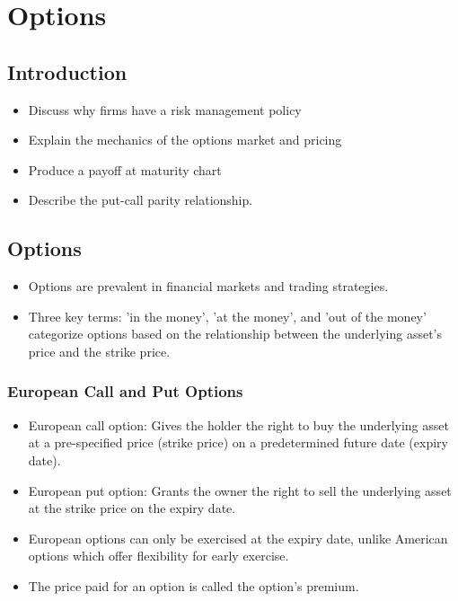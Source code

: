 \chapter{Options}
\section{Introduction}

\begin{itemize}
    \item Discuss why firms have a risk management policy
    \item Explain the mechanics of the options market and pricing
    \item Produce a payoff at maturity chart
    \item Describe the put-call parity relationship.
\end{itemize}

\section{Options}

\begin{itemize}
    \item Options are prevalent in financial markets and trading strategies.
    \item Three key terms: 'in the money', 'at the money', and 'out of the money' categorize options based on the relationship between the underlying asset's price and the strike price.
\end{itemize}

\subsection*{European Call and Put Options}

\begin{itemize}
    \item European call option: Gives the holder the right to buy the underlying asset at a pre-specified price (strike price) on a predetermined future date (expiry date).
    \item European put option: Grants the owner the right to sell the underlying asset at the strike price on the expiry date.
    \item European options can only be exercised at the expiry date, unlike American options which offer flexibility for early exercise.
    \item The price paid for an option is called the option's premium.
\end{itemize}

